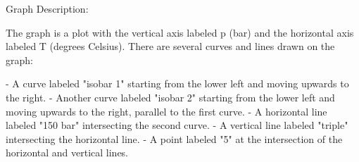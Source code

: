 Graph Description:

The graph is a plot with the vertical axis labeled p (bar) and the horizontal axis labeled T (degrees Celsius). There are several curves and lines drawn on the graph:

- A curve labeled "isobar 1" starting from the lower left and moving upwards to the right.
- Another curve labeled "isobar 2" starting from the lower left and moving upwards to the right, parallel to the first curve.
- A horizontal line labeled "150 bar" intersecting the second curve.
- A vertical line labeled "triple" intersecting the horizontal line.
- A point labeled "5" at the intersection of the horizontal and vertical lines.